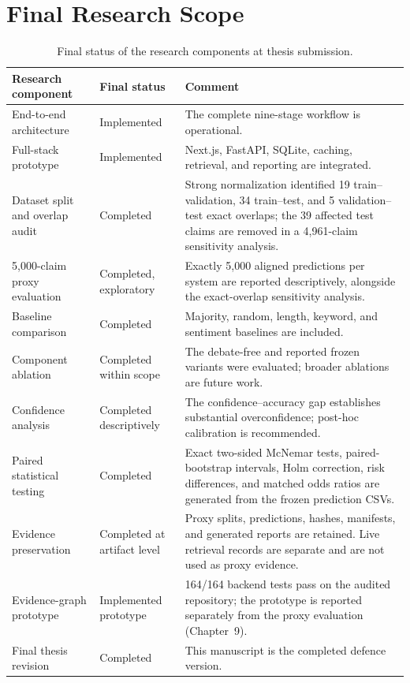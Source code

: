 \documentclass[12pt,a4paper,openany]{report}
\begin{document}
\section{Final Research Scope}
\begin{table}[H]
\centering
\caption{Final status of the research components at thesis submission.}
\label{tab:maturity}
\small
\begin{tabularx}{\textwidth}{p{4cm}p{2.6cm}X}
\toprule
Research component & Final status & Comment \\
\midrule
End-to-end architecture & Implemented & The complete nine-stage workflow is operational. \\
Full-stack prototype & Implemented & Next.js, FastAPI, SQLite, caching, retrieval, and reporting are integrated. \\
Dataset split and overlap audit & Completed & Strong normalization identified 19 train--validation, 34 train--test, and 5 validation--test exact overlaps; the 39 affected test claims are removed in a 4{,}961-claim sensitivity analysis. \\
5{,}000-claim proxy evaluation & Completed, exploratory & Exactly 5{,}000 aligned predictions per system are reported descriptively, alongside the exact-overlap sensitivity analysis. \\
Baseline comparison & Completed & Majority, random, length, keyword, and sentiment baselines are included. \\
Component ablation & Completed within scope & The debate-free and reported frozen variants were evaluated; broader ablations are future work. \\
Confidence analysis & Completed descriptively & The confidence--accuracy gap establishes substantial overconfidence; post-hoc calibration is recommended. \\
Paired statistical testing & Completed & Exact two-sided McNemar tests, paired-bootstrap intervals, Holm correction, risk differences, and matched odds ratios are generated from the frozen prediction CSVs. \\
Evidence preservation & Completed at artifact level & Proxy splits, predictions, hashes, manifests, and generated reports are retained. Live retrieval records are separate and are not used as proxy evidence. \\
Evidence-graph prototype & Implemented prototype & 164/164 backend tests pass on the audited repository; the prototype is reported separately from the proxy evaluation (Chapter~9). \\
Final thesis revision & Completed & This manuscript is the completed defence version. \\
\bottomrule
\end{tabularx}
\end{table}
\end{document}
